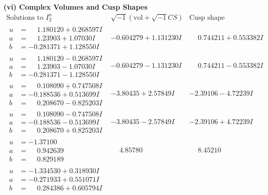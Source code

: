 \documentclass[1p]{elsarticle_modified}
\theoremstyle{definition}
\newcommand{\I}{\sqrt{-1}}
\begin{document}
\newpage\flushleft \textbf{(vi) Complex Volumes and Cusp Shapes}
$$\begin{array}{c|c|c}  
\text{Solutions to }I^u_{2}& \I (\text{vol} + \sqrt{-1}CS) & \text{Cusp shape}\\
 \hline 
\begin{aligned}
u &= \phantom{-}1.180120 + 0.268597 I \\
a &= \phantom{-}1.23903 + 1.07030 I \\
b &= -0.281371 + 1.128550 I\end{aligned}
 & -0.604279 + 1.131230 I & \phantom{-}0.744211 + 0.553382 I \\ \hline\begin{aligned}
u &= \phantom{-}1.180120 - 0.268597 I \\
a &= \phantom{-}1.23903 - 1.07030 I \\
b &= -0.281371 - 1.128550 I\end{aligned}
 & -0.604279 - 1.131230 I & \phantom{-}0.744211 - 0.553382 I \\ \hline\begin{aligned}
u &= \phantom{-}0.108090 + 0.747508 I \\
a &= -0.188536 + 0.513699 I \\
b &= \phantom{-}0.208670 - 0.825203 I\end{aligned}
 & -3.80435 + 2.57849 I & -2.39106 - 4.72239 I \\ \hline\begin{aligned}
u &= \phantom{-}0.108090 - 0.747508 I \\
a &= -0.188536 - 0.513699 I \\
b &= \phantom{-}0.208670 + 0.825203 I\end{aligned}
 & -3.80435 - 2.57849 I & -2.39106 + 4.72239 I \\ \hline\begin{aligned}
u &= -1.37100\phantom{ +0.000000I} \\
a &= \phantom{-}0.942639\phantom{ +0.000000I} \\
b &= \phantom{-}0.829189\phantom{ +0.000000I}\end{aligned}
 & \phantom{-}4.85780\phantom{ +0.000000I} & \phantom{-}8.45210\phantom{ +0.000000I} \\ \hline\begin{aligned}
u &= -1.334530 + 0.318930 I \\
a &= -0.271933 + 0.551071 I \\
b &= \phantom{-}0.284386 + 0.605794 I\end{aligned}

\end{array}$$
\end{document}
